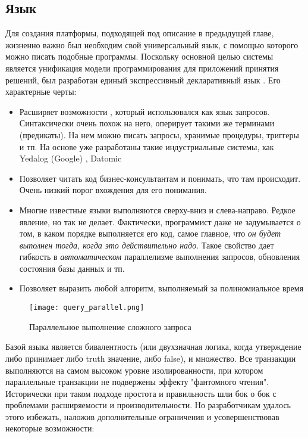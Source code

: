 \subsection{Язык \logiql}
\label{sec:technology:logiql}

Для создания платформы, подходящей под описание в предыдущей главе, жизненно важно был необходим свой универсальный язык, с помощью которого можно писать подобные программы. Поскольку основной целью системы является унификация модели программирования для приложений принятия решений, был  разработан единый экспрессивный декларативный  язык \logiql. Его характерные черты:

\begin{itemize}
  \item Расширяет возможности \datalog, который использовался как язык запросов. Синтаксически очень похож на него, оперирует такими же терминами (предикаты). На нем можно писать запросы, хранимые процедуры, триггеры и тп. На основе \datalog уже разработаны такие индустриальные системы, как Yedalog (Google) \cite{yedalog}, Datomic \cite{datomic}
  \item Позволяет читать код бизнес-консультантам и понимать, что там происходит. Очень низкий порог вхождения для его понимания.
  \item Многие известные языки выполняются сверху-вниз и слева\--\-на\-пра\-во. Редкое явление, но \logiql так не делает. Фактически, программист даже не задумывается о том, в каком порядке выполняется его код, самое главное, что \emph{он будет выполнен тогда, когда это действительно надо}. Такое свойство дает гибкость в \emph{автоматическом} параллелизме выполнения запросов, обновления состояния базы данных и тп.
  \item Позволяет выразить любой алгоритм, выполняемый за полиномиальное время \cite{languages_for_np_problems}
\end{itemize}

\begin{figure}
	\centering
	\texttt{[image: query\_parallel.png]}
	\caption{Параллельное выполнение сложного запроса \cite{query_parallel_execution}}
	\label{fig:technology:logiql:query_parallel}
\end{figure}

Базой языка является бивалентность (или двухзначная логика, когда утверждение либо принимает либо truth значение, либо false), и множество. Все транзакции выполняются на самом высоком уровне изолированности, при котором параллельные транзакции не подвержены эффекту "фантомного чтения". Исторически при таком подходе простота и правильность шли бок о бок с проблемами расширяемости и производительности. Но разработчикам \logiql удалось этого избежать, наложив дополнительные ограничения и усовершенствовав некоторые возможности:

